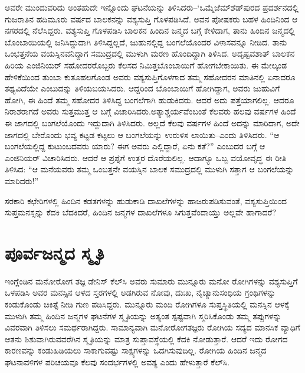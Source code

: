 ಅವರೇ ಮುಂದುವರಿದು ಅಂತಹುದೇ ಇನ್ನೊಂದು ಘಟನೆಯನ್ನು ತಿಳಿಸಿದರು–‘ಒಮ್ಮೆ\break ಜೆಮ್​ಶೆಡ್​ಪುರದ ಪ್ರದರ್ಶನದಲ್ಲಿ ಗುಜರಾತಿನ ಹದಿಮೂರು ವರ್ಷದ ಬಾಲಕನನ್ನು ವಶ್ಯಸುಪ್ತಿ ಗೊಳಪಡಿಸಿದೆ. ಅವನ ಪೋಷಕರು ಬಹಳ ಹಿಂದಿನಿಂದ ಆ ನಗರದಲ್ಲಿ ನೆಲೆಸಿದ್ದರು. ವಶ್ಯಸುಪ್ತಿ ಗೊಳಪಡಿಸಿ ಬಾಲಕನ ಹಿಂದಿನ ಜನ್ಮದ ಬಗ್ಗೆ ಕೇಳಿದಾಗ, ತಾನು ಹಿಂದಿನ ಜನ್ಮದಲ್ಲಿ ಬೊಂಬಾಯಿಯಲ್ಲಿ ಜನಿಸಿದ್ದುದಾಗಿ ತಿಳಿಸಿದ್ದಲ್ಲದೆ, ಜುಹುನಲ್ಲಿದ್ದ ಬಂಗಲೆಯೊಂದರ ವಿಳಾಸವನ್ನೂ ನೀಡಿದ. ತಾನು ಒಂಭತ್ತನೆಯ ವಯಸ್ಸಿನವನಿದ್ದಾಗ ಸಮುದ್ರದಲ್ಲಿ ಮುಳುಗಿ ಮರಣ ಹೊಂದಿದ್ದಾಗಿ ತಿಳಿಸಿದ. ಅದೃಷ್ಟವಶಾತ್ ಬಾಲಕನ ಹಿರಿಯ ಎಂಜಿನಿಯರ್ ಸಹೋದರರೊಬ್ಬರು ಕೆಲಸದ ನಿಮಿತ್ತ\break ಬೊಂಬಾಯಿಗೆ ಹೋಗಬೇಕಾಯಿತು. ಈ ಮೇಲ್ಕಂಡ ಹೇಳಿಕೆಯಿಂದ ತುಂಬಾ ಕುತೂಹಲಗೊಂಡ ಅವರು ವಶ್ಯಸುಪ್ತಿಗೊಳಗಾದ ತಮ್ಮ ಸಹೋದರನ ಮಾತಿನಲ್ಲಿ ಏನಾದರೂ ತಥ್ಯವಿದೆಯೇ ಎಂಬು\-ದನ್ನು ತಿಳಿಯಬಯಸಿದರು. ಆದ್ದರಿಂದ ಬೊಂಬಾಯಿಗೆ ಹೋಗಿದ್ದಾಗ, ಅವರು ಜುಹುವಿಗೆ ಹೋಗಿ, ಈ ಹಿಂದೆ ತಮ್ಮ ಸಹೋದರ ತಿಳಿಸಿದ್ದ ಬಂಗಲೆಗಾಗಿ ಹುಡುಕಿದರು. ಆದರೆ ಅದು ಪತ್ತೆಯಾಗಲಿಲ್ಲ. ಆದರೂ ನಿರಾಶರಾಗದೆ ಅವರು ಸುತ್ತಮುತ್ತ ಆ ಬಗ್ಗೆ ವಿಚಾರಿಸಿದರು.\break ಅತ್ಯಾಶ್ಚರ್ಯವೆಂಬಂತೆ ಕೆಲವರು ಹಲವು ವರ್ಷಗಳ ಹಿಂದೆ ಈ ಜಾಗದಲ್ಲಿ ಬಂಗಲೆಯೊಂದು ಇದ್ದುದಾಗಿ ತಿಳಿಸಿದರು. ಅಲ್ಲದೆ ಕೆಲವು ವರ್ಷಗಳ ಹಿಂದೆ ಅದನ್ನು ಮಾರಿದಾಗ, ಅದೇ ಜಾಗದಲ್ಲಿ ಬೇರೊಂದು ಭವ್ಯ ಕಟ್ಟಡ ಕಟ್ಟಲು ಆ ಬಂಗಲೆಯನ್ನು ಉರುಳಿಸ ಲಾಯಿತು–ಎಂದು ತಿಳಿಸಿದರು. “ಆ ಬಂಗಲೆಯಲ್ಲಿದ್ದ ಕುಟುಂಬದವರು ಯಾರು? ಈಗ ಅವರು ಎಲ್ಲಿದ್ದಾರೆ, ಏನು ಕತೆ?” ಎಂಬುದರ ಬಗ್ಗೆ ಆ ಎಂಜಿನಿಯರ್ ವಿಚಾರಿಸಿದರು. ಆದರೆ ಆ ಪ್ರಶ್ನೆಗೆ ಉತ್ತರ ದೊರೆಯಲಿಲ್ಲ. ಆದಾಗ್ಯೂ ಒಬ್ಬ ವಯೋವೃದ್ಧ ಈ ರೀತಿ ತಿಳಿಸಿದ: “ಆ ಮನೆಯವರು ತಮ್ಮ ಒಂಬತ್ತನೇ ವಯಸ್ಸಿನ ಬಾಲಕ ಸಮುದ್ರದಲ್ಲಿ ಮುಳುಗಿ ಸತ್ತಾಗ ಆ ಬಂಗಲೆಯನ್ನು ಮಾರಿದರು!”

ಸರಕಾರಿ ಕಛೇರಿಗಳಲ್ಲಿ ಹಿಂದಿನ ಕಡತಗಳನ್ನು ಹುಡುಕಾಡಿ ದಾಖಲೆಗಳನ್ನು ಹಾಜರುಪಡಿಸುವಂತೆ, ವಶ್ಯಸುಪ್ತಿಯಿಂದ ಸುಪ್ತಮನಸ್ಸನ್ನು ಕೆದಕಿ ಬೆದಕಿದರೆ, ಹಿಂದಿನ ಜನ್ಮಗಳ ದಾಖಲೆಗಳೂ ಸಿಗುತ್ತವೆಂದಾಯ್ತು ಅಲ್ಲವೇ ಹಾಗಾದರೆ?


\section*{ಪೂರ್ವಜನ್ಮದ ಸ್ಮೃತಿ}


ಇಂಗ್ಲೆಂಡಿನ ಮನೋರೋಗ ತಜ್ಞ ಡೇನಿಸ್ ಕೆಲ್​ಸಿ ಅವರು ಸುಮಾರು ಮುನ್ನೂರು ಮನೋ ರೋಗಿಗಳನ್ನು ವಶ್ಯಸುಪ್ತಿಗೆ ಒಳಪಡಿಸಿ ಅವರ ಮನಸ್ಸಿನ ಆಳದ ಸ್ತರಗಳಲ್ಲಿ ಅಡಗಿರುವ ನೋವು, ದುಃಖ, ನೈಚ್ಯಾನುಸಂಧಿಯ ಗ್ರಂಥಿಗಳನ್ನು  ಕಂಡುಕೊಂಡು ಚಿಕಿತ್ಸೆ ನೀಡಿ ಗುಣ ಪಡಿಸಿದ್ದರು. ಮುನ್ನೂರು ಮಂದಿ ರೋಗಿಗಳೂ ಸುಪ್ತಸ್ಥಿತಿಯಲ್ಲಿ ಮನಸ್ಸಿನ ಆಳಕ್ಕೆ ಮುಳುಗಿ ತಮ್ಮ ಹಿಂದಿನ ಜನ್ಮಗಳ ಘಟನೆಗಳ ಸ್ಮೃತಿಯನ್ನು ಅತ್ಯಂತ ಸ್ಪಷ್ಟವಾಗಿ ಸ್ಮರಿಸಿಕೊಂಡು ತಮ್ಮ ತಪ್ಪುಗಳನ್ನು ವಿವರವಾಗಿ ತಿಳಿಸಲು ಸಮರ್ಥರಾಗಿದ್ದರು. ಸಾಮಾನ್ಯವಾಗಿ ಮನೋರೋಗತಜ್ಞರು ರೋಗಿಯ ಸದ್ಯದ ಮಾನಸಿಕ ವ್ಯಾಧಿಗೆ ಆತನು ಶಿಶುವಾಗಿರುವವರೆಗಿನ ಸ್ಮೃತಿಯನ್ನು ಮಾತ್ರ ಸುಪ್ತಾವಸ್ಥೆಯಲ್ಲಿ ಕೆದಕಿ ನೋಡುತ್ತಾರೆ. ಆದರೆ ಇದು ರೋಗದ ಕಾರಣವನ್ನು ಕಂಡುಹಿಡಿಯಲು ಸಾಕಾಗುವಷ್ಟು ಸಾಕ್ಷ್ಯಗಳನ್ನು ಒದಗಿಸುವುದಿಲ್ಲ. ರೋಗಿಯ ಹಿಂದಿನ ಜನ್ಮದ ಘಟನಾವಳಿಗಳ ಪರಿಚಯವೂ ಕೆಲವು ಸಂದರ್ಭಗಳಲ್ಲಿ ಅವಶ್ಯ ಎಂದು ಹೇಳುತ್ತಾರೆ ಕೆಲ್​ಸಿ.

